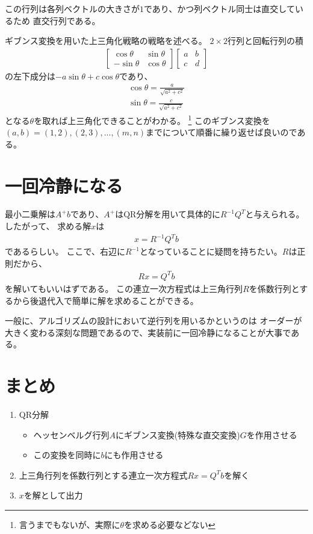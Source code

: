 \documentclass{jarticle}
\begin{document}
この行列は各列ベクトルの大きさが$1$であり、かつ列ベクトル同士は直交しているため
直交行列である。
\par
ギブンス変換を用いた上三角化戦略の戦略を述べる。
$2\times 2$行列と回転行列の積
\begin{align}
\begin{bmatrix}
 \cos \theta    & \sin \theta \\
-\sin \theta    & \cos \theta 
\end{bmatrix}
\begin{bmatrix}
 a & b \\ c & d
\end{bmatrix}
\end{align}
の左下成分は$-a\sin\theta+c\cos\theta$であり、
\begin{align}
\cos \theta = \frac{a}{\sqrt{a^2+c^2}}
\\
\sin \theta = \frac{c}{\sqrt{a^2+c^2}}
\end{align}
となる$\theta$を取れば上三角化できることがわかる。
\footnote{
    言うまでもないが、実際に$\theta$を求める必要などない
}
このギブンス変換を$(a,b)=(1,2),(2,3),...,(m,n)$までについて順番に繰り返せば良いのである。

\section{一回冷静になる}
最小二乗解は$A^{+}b$であり、$A^{+}$はQR分解を用いて具体的に$R^{-1}Q^T$と与えられる。したがって、
求める解$x$は
\begin{align}
x = R^{-1}Q^Tb
\end{align}
であるらしい。
ここで、右辺に$R^{-1}$となっていることに疑問を持ちたい。$R$は正則だから、
\begin{align}
Rx = Q^Tb
\end{align}
を解いてもいいはずである。
この連立一次方程式は上三角行列$R$を係数行列とするから後退代入で簡単に解を求めることができる。
\par
一般に、アルゴリズムの設計において逆行列を用いるかというのは
オーダーが大きく変わる深刻な問題であるので、実装前に一回冷静になることが大事である。
\section{まとめ}
\begin{enumerate}
\item QR分解
\begin{itemize}
\item ヘッセンベルグ行列$A$にギブンス変換(特殊な直交変換)$G$を作用させる
\item この変換を同時に$b$にも作用させる
\end{itemize}
\item 上三角行列を係数行列とする連立一次方程式$Rx=Q^Tb$を解く
\item $x$を解として出力
\end{enumerate}
\end{document}
